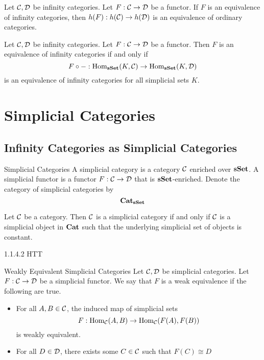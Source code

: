 \documentclass[a4paper]{article}
\begin{document}
\begin{prp}{}{} Let $\mathcal{C},\mathcal{D}$ be infinity categories. Let $F:\mathcal{C}\to\mathcal{D}$ be a functor. If $F$ is an equivalence of infinity categories, then $h(F):h(\mathcal{C})\to h(\mathcal{D})$ is an equivalence of ordinary categories. 
\end{prp}

\begin{prp}{}{} Let $\mathcal{C},\mathcal{D}$ be infinity categories. Let $F:\mathcal{C}\to\mathcal{D}$ be a functor. Then $F$ is an equivalence of infinity categories if and only if $$F\circ -:\operatorname{Hom}_\bold{sSet}(K,\mathcal{C})\to\operatorname{Hom}_\bold{sSet}(K,\mathcal{D})$$ is an equivalence of infinity categories for all simplicial sets $K$. 
\end{prp}

\pagebreak
\section{Simplicial Categories}
\subsection{Infinity Categories as Simplicial Categories}
\begin{defn}{Simplicial Categories}{} A simplicial category is a category $\mathcal{C}$ enriched over $\bold{sSet}$. A simplicial functor is a functor $F:\mathcal{C}\to\mathcal{D}$ that is $\bold{sSet}$-enriched. Denote the category of simplicial categories by $$\bold{Cat}_\bold{sSet}$$
\end{defn}

\begin{prp}{}{} Let $\mathcal{C}$ be a category. Then $\mathcal{C}$ is a simplicial category if and only if $\mathcal{C}$ is a simplicial object in $\bold{Cat}$ such that the underlying simplicial set of objects is constant. 
\end{prp}

1.1.4.2 HTT

\begin{defn}{Weakly Equivalent Simplicial Categories}{} Let $\mathcal{C},\mathcal{D}$ be simplicial categories. Let $F:\mathcal{C}\to\mathcal{D}$ be a simplicial functor. We say that $F$ is a weak equivalence if the following are true. 
\begin{itemize}
\item For all $A,B\in\mathcal{C}$, the induced map of simplicial sets $$F:\operatorname{Hom}_{\mathcal{C}}(A,B)\to\operatorname{Hom}_{\mathcal{C}}(F(A),F(B))$$ is weakly equivalent. 
\item For all $D\in\mathcal{D}$, there exists some $C\in\mathcal{C}$ such that $F(C)\cong D$
\end{itemize}
\end{defn}
\end{document}
